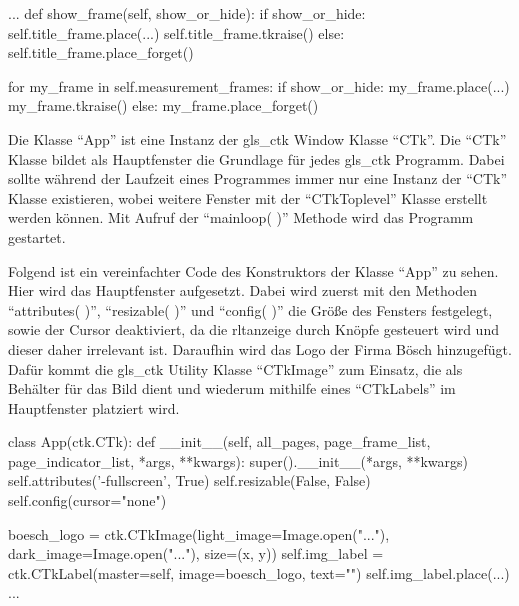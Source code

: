 \begin{pythoncode}
...
	def show_frame(self, show_or_hide):
		if show_or_hide:
			self.title_frame.place(...)
			self.title_frame.tkraise()
		else:
			self.title_frame.place_forget()
		
		for my_frame in self.measurement_frames:
			if show_or_hide:
				my_frame.place(...)
				my_frame.tkraise()
			else:
				my_frame.place_forget()
\end{pythoncode}

Die Klasse \enquote{App} ist eine Instanz der \gls{gls_ctk} Window Klasse \enquote{CTk}. Die \enquote{CTk} Klasse bildet als Hauptfenster die Grundlage für jedes \gls{gls_ctk} Programm. Dabei sollte während der Laufzeit eines Programmes immer nur eine Instanz der \enquote{CTk} Klasse existieren, wobei weitere Fenster mit der \enquote{CTkToplevel} Klasse erstellt werden können. Mit Aufruf der \enquote{mainloop( )} Methode wird das Programm gestartet.
\cite[vgl.][]{Schimansky:o.J.} 

Folgend ist ein vereinfachter Code des Konstruktors der Klasse \enquote{App} zu sehen. Hier wird das Hauptfenster aufgesetzt. Dabei wird zuerst mit den Methoden \enquote{attributes( )}, \enquote{resizable( )} und \enquote{config( )} die Größe des Fensters festgelegt, sowie der Cursor deaktiviert, da die \acs{rltanzeige} durch Knöpfe gesteuert wird und dieser daher irrelevant ist. Daraufhin wird das Logo der Firma Bösch hinzugefügt. Dafür kommt die \gls{gls_ctk} Utility Klasse \enquote{CTkImage} zum Einsatz, die als Behälter für das Bild dient und wiederum mithilfe eines \enquote{CTkLabels} im Hauptfenster platziert wird.

\begin{pythoncode}
class App(ctk.CTk):
	def __init__(self, all_pages, page_frame_list, page_indicator_list, *args, **kwargs):
		super().__init__(*args, **kwargs)
		self.attributes('-fullscreen', True)
		self.resizable(False, False)
		self.config(cursor="none")
		
		boesch_logo = ctk.CTkImage(light_image=Image.open("..."), dark_image=Image.open("..."), size=(x, y))
		self.img_label = ctk.CTkLabel(master=self, image=boesch_logo, text="")
		self.img_label.place(...)
...
\end{pythoncode}


